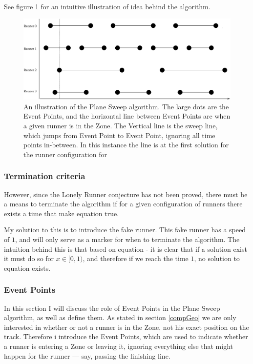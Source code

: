 See figure \ref{algoIlluImg} for an intuitive illustration of idea behind the algorithm. 

\begin{figure}[H]
  \centering
  \includegraphics[width=\textwidth]{./images/algoIlluEPS}
  \caption{\label{algoIlluImg}An illustration of the Plane Sweep algorithm. The large dots are the Event Points, and the horizontal line between Event Points are when a given runner is in the Zone. The Vertical line is the sweep line, which jumps from Event Point to Event Point, ignoring all time points in-between. In this instance the line is at the first solution for the runner configuration for }
\end{figure}

\subsubsection{Termination criteria}
\label{termination}
However, since the Lonely Runner conjecture has not been proved, there must be a means to terminate the algorithm if for a given configuration of runners there exists a time that make equation  true.

My solution to this is to introduce the fake runner. This fake runner has a speed of $1$, and will only serve as a marker for when to terminate the algorithm. The intuition behind this is that based on equation  - it is clear that if a solution exist it must do so for $x \in [0,1)$, and therefore if we reach the time $1$, no solution to equation  exists. 

\subsubsection{Event Points}
\label{eventPoints}
In this section I will discuss the role of Event Points in the Plane Sweep algorithm, as well as define them. As stated in section \ref{compGeo} we are only interested in whether or not a runner is in the Zone, not his exact position on the track. Therefore i introduce the Event Points, which are used to indicate whether a runner is entering a Zone or leaving it, ignoring everything else that might happen for the runner --- say, passing the finishing line. 

